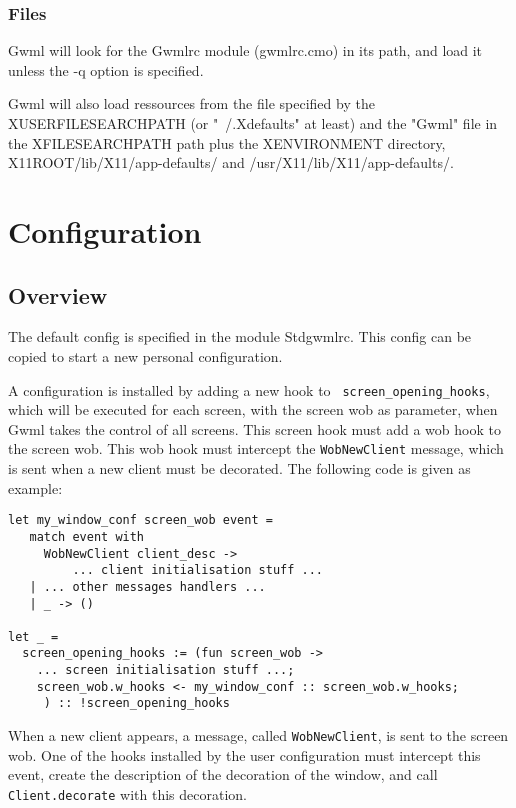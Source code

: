 \documentclass{book}
\begin{document}
\subsection{Files}

  Gwml will look for the Gwmlrc module (gwmlrc.cmo) in its path, and load 
it unless the -q option is specified.

  Gwml will also load ressources from the file specified by the
XUSERFILESEARCHPATH (or "~/.Xdefaults" at least) and the "Gwml" file
in the XFILESEARCHPATH path plus the XENVIRONMENT directory, 
X11ROOT/lib/X11/app-defaults/ and /usr/X11/lib/X11/app-defaults/.

\chapter{Configuration}

\section{Overview}

  The default config is specified in the module Stdgwmlrc. This config
can be copied to start a new personal configuration.

  A configuration is installed by adding a new hook to {\tt 
screen\_opening\_hooks}, which will be executed for each screen, with the 
screen wob as parameter, when Gwml takes the control of all screens. This
screen hook must add a wob hook to the screen wob. This wob hook must 
intercept the {\tt WobNewClient} message, which is sent when a new client
must be decorated. The following code is given as example: 

\begin{verbatim}
let my_window_conf screen_wob event =
   match event with
     WobNewClient client_desc -> 
         ... client initialisation stuff ...
   | ... other messages handlers ...
   | _ -> ()
 
let _ =
  screen_opening_hooks := (fun screen_wob ->
    ... screen initialisation stuff ...;
    screen_wob.w_hooks <- my_window_conf :: screen_wob.w_hooks;
     ) :: !screen_opening_hooks
\end{verbatim}
  
  When a new client appears, a message, called {\tt WobNewClient}, is sent
to the screen wob. One of the hooks installed by the user configuration must
intercept this event, create the description of the decoration of the window,
and call {\tt Client.decorate} with this decoration.
\end{document}
